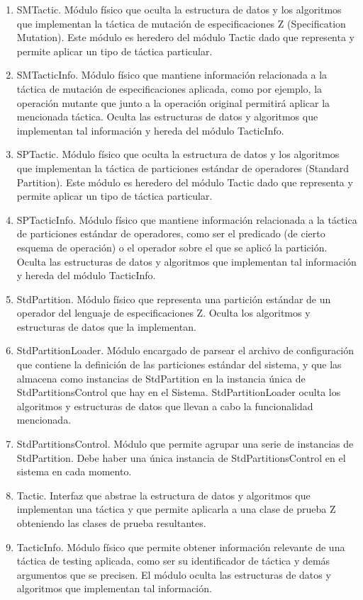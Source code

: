 \documentclass[a4paper,10pt]{report}
\begin{document}
\begin{enumerate}
						\item{SMTactic. Módulo físico que oculta la estructura de datos y los algoritmos que implementan la táctica de mutación de especificaciones Z (Specification Mutation). Este módulo es heredero del módulo Tactic dado que representa y permite aplicar un tipo de táctica particular.}
						\item{SMTacticInfo. Módulo físico que mantiene información relacionada a la táctica de mutación de especificaciones aplicada, como por ejemplo, la operación mutante que junto a la operación original permitirá aplicar la mencionada táctica. Oculta las estructuras de datos y algoritmos que implementan tal información y hereda del módulo TacticInfo.}
						\item{SPTactic. Módulo físico que oculta la estructura de datos y los algoritmos que implementan la táctica de particiones estándar de operadores (Standard Partition). Este módulo es heredero del módulo Tactic dado que representa y permite aplicar un tipo de táctica particular.}
						\item{SPTacticInfo. Módulo físico que mantiene información relacionada a la táctica de particiones estándar de operadores, como ser el predicado (de cierto esquema de operación) o el operador sobre el que se aplicó la partición. Oculta las estructuras de datos y algoritmos que implementan tal información y hereda del módulo TacticInfo.}
						\item{StdPartition. Módulo físico que representa una partición estándar de un operador del lenguaje de especificaciones Z. Oculta los algoritmos y estructuras de datos que la implementan.}
						\item{StdPartitionLoader. Módulo encargado de parsear el archivo de configuración que contiene la definición de las particiones estándar del sistema, y que las almacena como instancias de StdPartition en la instancia única de StdPartitionsControl que hay en el Sistema. StdPartitionLoader oculta los algoritmos y estructuras de datos que llevan a cabo la funcionalidad mencionada.}
						\item{StdPartitionsControl. Módulo que permite agrupar una serie de instancias de StdPartition. Debe haber una única instancia de StdPartitionsControl en el sistema en cada momento.	}
						\item{Tactic. Interfaz que abstrae la estructura de datos y algoritmos que implementan una táctica y que permite aplicarla a una clase de prueba Z obteniendo las clases de prueba resultantes.}
						\item{TacticInfo. Módulo físico que permite obtener información relevante de una táctica de testing aplicada, como ser su identificador de táctica y demás argumentos que se precisen. El módulo oculta las estructuras de datos y algoritmos que implementan tal información.}
					\end{enumerate}
\end{document}
